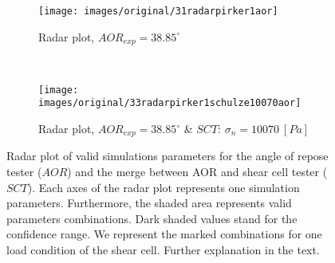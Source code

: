 \begin{figure}[htp] \centering
    \begin{subfigure}[b]{0.96\columnwidth}
        \texttt{[image: images/original/31radarpirker1aor]}
        \caption{Radar plot, $AOR_{exp} = 38.85 ^\circ$}
        \label{fig:31radarpirker1aor} 
    \end{subfigure}\\
        \begin{subfigure}[b]{0.96\columnwidth}
        \texttt{[image: images/original/33radarpirker1schulze10070aor]}
        \caption{Radar plot, $AOR_{exp} = 38.85
        ^\circ$ \& $SCT$: $\sigma_n=10070 ~[Pa]$}
        \label{fig:33radarpirker1schulze10070aor} 
    \end{subfigure}
    \caption[Radar plot of valid simulations parameters for the AOR and
    the merge between AOR and SCT valid parameters]{Radar plot of valid
    simulations parameters for the angle of repose tester ($AOR$) and the merge
    between AOR and shear cell tester ($SCT$).
    Each axes of the radar plot represents one simulation parameters.
    Furthermore, the shaded area represents valid parameters combinations.
    Dark shaded values stand for the confidence range.
    We represent the marked combinations for one load condition of the shear
    cell.
    Further explanation in the text. }
    \label{fig:35schulze10070aorradarandcloud}
\end{figure}


